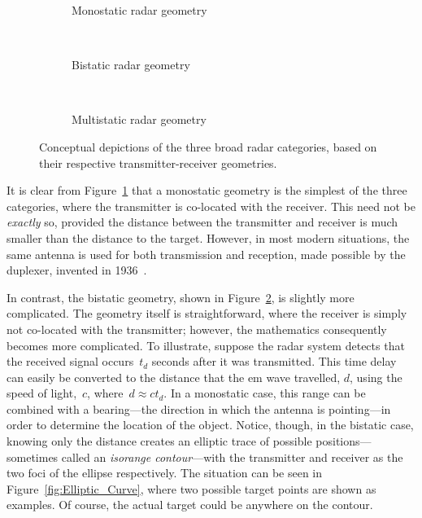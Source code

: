 \documentclass[class=report,11pt,crop=false]{standalone}
\begin{document}
\begin{figure}[htbp]
    \centering
    \captionsetup{type=figure}
    \begin{subfigure}[t]{0.48\textwidth}
        \centering
        \def\svgwidth{\linewidth}
        { %
            }
        \caption{Monostatic radar geometry}
        \label{fig:Geometry_Monostatic}
    \end{subfigure}%
    ~ 
    \begin{subfigure}[t]{0.48\textwidth}
        \centering
        \def\svgwidth{\linewidth}
        { %
            }
        \caption{Bistatic radar geometry}
        \label{fig:Geometry_Bistatic}
    \end{subfigure}
    ~
    \begin{subfigure}[t]{0.6\textwidth}
        \centering
        \def\svgwidth{\linewidth}
        { %
            }
        \caption{Multistatic radar geometry}
        \label{fig:Geometry_Multistatic}
    \end{subfigure}%
    \caption{Conceptual depictions of the three broad radar categories, based on their respective transmitter-receiver geometries.}
    \label{fig:Radar_Geometry_Depictions}
\end{figure}

It is clear from Figure~\ref{fig:Geometry_Monostatic} that a monostatic geometry is the simplest of the three categories, where the transmitter is co-located with the receiver. This need not be \emph{exactly} so, provided the distance between the transmitter and receiver is much smaller than the distance to the target. However, in most modern situations, the same antenna is used for both transmission and reception, made possible by the duplexer, invented in 1936~\cite{kuschel-hagan-history}.

In contrast, the bistatic geometry, shown in Figure~\ref{fig:Geometry_Bistatic}, is slightly more complicated. The geometry itself is straightforward, where the receiver is simply not co-located with the transmitter; however, the mathematics consequently becomes more complicated. To illustrate, suppose the radar system detects that the received signal occurs~\(t_d\) seconds after it was transmitted. This time delay can easily be converted to the distance that the \gls{em} wave travelled, \(d\), using the speed of light,~\(c\), where~\(d \approx ct_d\). In a monostatic case, this range can be combined with a bearing---the direction in which the antenna is pointing---in order to determine the location of the object. Notice, though, in the bistatic case, knowing only the distance creates an elliptic trace of possible positions---sometimes called an \emph{isorange contour}---with the transmitter and receiver as the two foci of the ellipse respectively. The situation can be seen in Figure~\ref{fig:Elliptic_Curve}, where two possible target points are shown as examples. Of course, the actual target could be anywhere on the contour.
\end{document}

